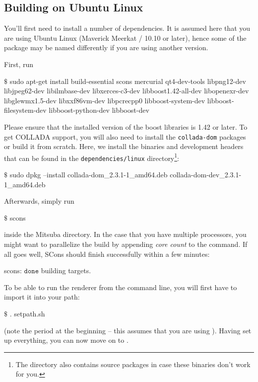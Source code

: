 \subsection{Building on Ubuntu Linux}
\label{sec:compiling-ubuntu}
You'll first need to install a number of dependencies. It is assumed here
that you are using Ubuntu Linux (Maverick Meerkat / 10.10 or later), hence some of the package may be named differently if you are 
using another version.

First, run
\begin{shell}
$\text{\$}$ sudo apt-get install build-essential scons mercurial qt4-dev-tools libpng12-dev 
    libjpeg62-dev libilmbase-dev libxerces-c3-dev libboost1.42-all-dev 
	libopenexr-dev libglewmx1.5-dev libxxf86vm-dev libpcrecpp0
	libboost-system-dev libboost-filesystem-dev libboost-python-dev libboost-dev
\end{shell}
Please ensure that the installed version of the boost libraries is 1.42 or later.
To get COLLADA support, you will also need to install the \texttt{collada-dom} packages or build it from scratch. Here, we install the  binaries and development headers that can be found in the \texttt{dependencies/linux} directory\footnote{The directory also contains source packages in case these binaries don't work for you.}:
\begin{shell}
$\text{\$}$ sudo dpkg --install collada-dom_2.3.1-1_amd64.deb collada-dom-dev_2.3.1-1_amd64.deb
\end{shell}
Afterwards, simply run
\begin{shell}
$\text{\$}$ scons
\end{shell}
inside the Mitsuba directory. In the case that you have multiple processors, you might want to parallelize the build by appending \emph{core count} to the command.
If all goes well, SCons should finish successfully within a few minutes:
\begin{shell}
scons: $\texttt{done}$ building targets.
\end{shell}
To be able to run the renderer from the command line, you will first have to import it into your path:
\begin{shell}
$\text{\$}$ . setpath.sh
\end{shell}
(note the period at the beginning -- this assumes that you are using ).
Having set up everything, you can now move on to .
